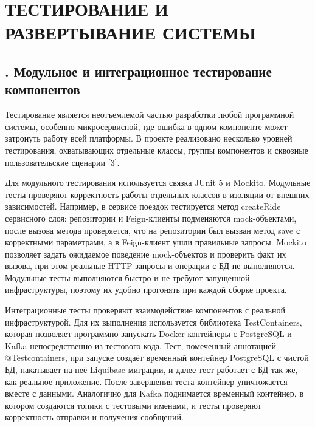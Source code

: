 \setcounter{chaptercntr}{4}

\sectionbreak \section*{
\gostTitleFont
\redline
\thechaptercntr \space
ТЕСТИРОВАНИЕ И РАЗВЕРТЫВАНИЕ СИСТЕМЫ
}

\titlespace

\subsection*{
\gostTitleFont
\redline
\thechaptercntr .\thesubchaptercntr \spc
Модульное и интеграционное тестирование компонентов
} \addtocounter{subchaptercntr}{1}

\subtitlespace

{\gostFont

\par \redline Тестирование является неотъемлемой частью разработки любой программной системы, особенно микросервисной, где ошибка в одном компоненте может затронуть работу всей платформы. В проекте реализовано несколько уровней тестирования, охватывающих отдельные классы, группы компонентов и сквозные пользовательские сценарии [3].

\par \redline Для модульного тестирования используется связка JUnit 5 и Mockito. Модульные тесты проверяют корректность работы отдельных классов в изоляции от внешних зависимостей. Например, в сервисе поездок тестируется метод createRide сервисного слоя: репозитории и Feign-клиенты подменяются mock-объектами, после вызова метода проверяется, что на репозитории был вызван метод save с корректными параметрами, а в Feign-клиент ушли правильные запросы. Mockito позволяет задать ожидаемое поведение mock-объектов и проверить факт их вызова, при этом реальные HTTP-запросы и операции с БД не выполняются. Модульные тесты выполняются быстро и не требуют запущенной инфраструктуры, поэтому их удобно прогонять при каждой сборке проекта.

\par \redline Интеграционные тесты проверяют взаимодействие компонентов с реальной инфраструктурой. Для их выполнения используется библиотека TestContainers, которая позволяет программно запускать Docker-контейнеры с PostgreSQL и Kafka непосредственно из тестового кода. Тест, помеченный аннотацией @Testcontainers, при запуске создаёт временный контейнер PostgreSQL с чистой БД, накатывает на неё Liquibase-миграции, и далее тест работает с БД так же, как реальное приложение. После завершения теста контейнер уничтожается вместе с данными. Аналогично для Kafka поднимается временный контейнер, в котором создаются топики с тестовыми именами, и тесты проверяют корректность отправки и получения сообщений.

}
